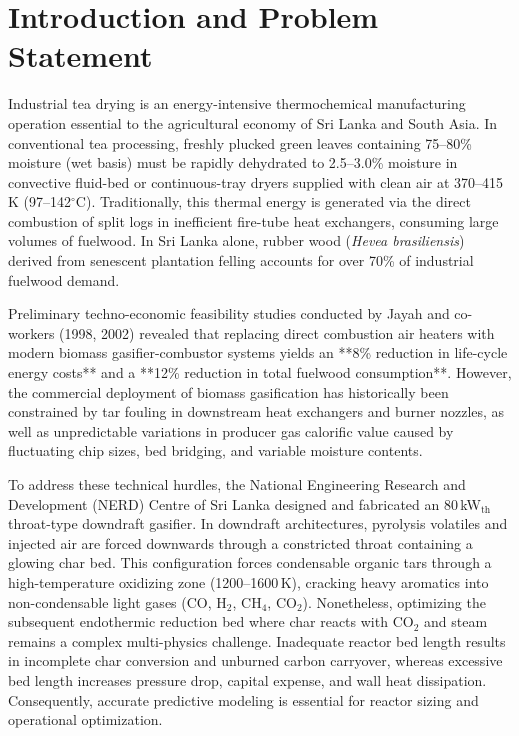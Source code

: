 \documentclass[11pt,a4paper]{article}
\begin{document}
\section{Introduction and Problem Statement}
Industrial tea drying is an energy-intensive thermochemical manufacturing operation essential to the agricultural economy of Sri Lanka and South Asia. In conventional tea processing, freshly plucked green leaves containing 75--80\% moisture (wet basis) must be rapidly dehydrated to 2.5--3.0\% moisture in convective fluid-bed or continuous-tray dryers supplied with clean air at 370--415\,K (97--142$^\circ$C). Traditionally, this thermal energy is generated via the direct combustion of split logs in inefficient fire-tube heat exchangers, consuming large volumes of fuelwood. In Sri Lanka alone, rubber wood (\textit{Hevea brasiliensis}) derived from senescent plantation felling accounts for over 70\% of industrial fuelwood demand.

Preliminary techno-economic feasibility studies conducted by Jayah and co-workers (1998, 2002) revealed that replacing direct combustion air heaters with modern biomass gasifier-combustor systems yields an **8\% reduction in life-cycle energy costs** and a **12\% reduction in total fuelwood consumption**. However, the commercial deployment of biomass gasification has historically been constrained by tar fouling in downstream heat exchangers and burner nozzles, as well as unpredictable variations in producer gas calorific value caused by fluctuating chip sizes, bed bridging, and variable moisture contents.

To address these technical hurdles, the National Engineering Research and Development (NERD) Centre of Sri Lanka designed and fabricated an 80\,kW$_{\text{th}}$ throat-type downdraft gasifier. In downdraft architectures, pyrolysis volatiles and injected air are forced downwards through a constricted throat containing a glowing char bed. This configuration forces condensable organic tars through a high-temperature oxidizing zone (1200--1600\,K), cracking heavy aromatics into non-condensable light gases (CO, H$_2$, CH$_4$, CO$_2$). Nonetheless, optimizing the subsequent endothermic reduction bed where char reacts with CO$_2$ and steam remains a complex multi-physics challenge. Inadequate reactor bed length results in incomplete char conversion and unburned carbon carryover, whereas excessive bed length increases pressure drop, capital expense, and wall heat dissipation. Consequently, accurate predictive modeling is essential for reactor sizing and operational optimization.
\end{document}
